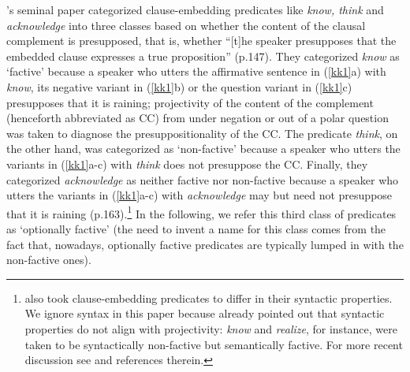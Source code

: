 \documentclass[11pt,fleqn]{article}
\newcommand{\6}{\mbox{$[\hspace*{-.6mm}[$}}
\newcommand{\9}{\mbox{$]\hspace*{-.6mm}]$}}
\newcommand{\citepos}[1]{\citeauthor{#1}'s \citeyear{#1}}
\begin{document}
\citepos{kiparsky-kiparsky70} seminal paper categorized clause-embedding predicates like {\em know, think} and {\em acknowledge} into three classes based on whether the content of the clausal complement is presupposed, that is, whether ``[t]he speaker presupposes that the embedded clause expresses a true proposition'' (p.147). They categorized {\em know} as `factive' because a speaker who utters the affirmative sentence in (\ref{kk1}a) with {\em know}, its negative variant in (\ref{kk1}b) or the question variant in (\ref{kk1}c) presupposes that it is raining; projectivity of the content of the complement (henceforth abbreviated as CC) from under negation or out of a polar question was taken to diagnose the presuppositionality of the CC. The predicate {\em think}, on the other hand, was categorized as `non-factive' because a speaker who utters the variants in (\ref{kk1}a-c) with {\em think} does not presuppose the CC. Finally, they categorized {\em acknowledge} as neither factive nor non-factive because a speaker who utters the variants in (\ref{kk1}a-c) with {\em acknowledge} may but need not presuppose that it is raining (p.163).\footnote{\citet{kiparsky-kiparsky70} also took clause-embedding predicates to differ in their syntactic properties. We ignore syntax in this paper because \citet[fn.3]{kiparsky-kiparsky70} already pointed out that syntactic properties do not align with projectivity: {\em know} and {\em realize}, for instance, were taken to be syntactically non-factive but semantically factive. For more recent discussion see \citealt{white-rawlins-nels2018} and references therein.} In the following, we refer this third class of predicates as `optionally factive' (the need to invent a name for this class comes from the fact that, nowadays, optionally factive predicates are typically lumped in with the non-factive ones).
\end{document}
